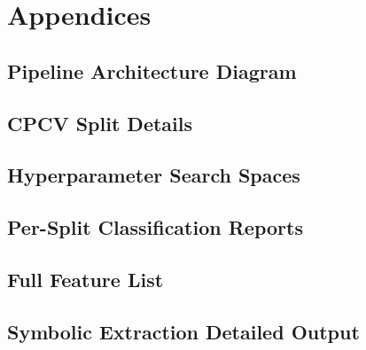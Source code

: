 \documentclass[12pt,a4paper,oneside]{article}
\begin{document}
\newpage
{}
\thispagestyle{plain}

\nocite{*}



\newpage
{}
\thispagestyle{plain}

\appendix
\section{Appendices}\label{sec:appendices}

\subsection{Pipeline Architecture Diagram}\label{app:pipeline}

\subsection{CPCV Split Details}\label{app:cpcv_splits}

\subsection{Hyperparameter Search Spaces}\label{app:hyperparams}

\subsection{Per-Split Classification Reports}\label{app:split_reports}

\subsection{Full Feature List}\label{app:features}

\subsection{Symbolic Extraction Detailed Output}\label{app:symbolic}
\end{document}
